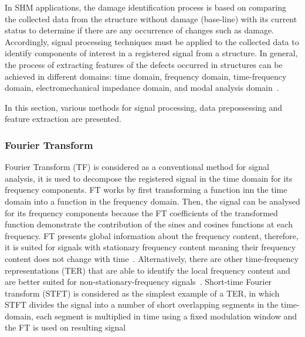 In SHM applications, the damage identification process is based on comparing the collected data from the structure without damage (base-line) with its current status to determine if there are any occurrence of changes such as damage.
Accordingly, signal processing techniques must be applied to the collected data to identify components of interest in a registered signal from a structure.
In general, the process of extracting features of the defects occurred in structures can be achieved in different domains: time domain, frequency domain, time-frequency domain, electromechanical impedance domain, and modal analysis domain~\cite{Khan2019}.

In this section, various methods for signal processing, data prepossessing and feature extraction are presented.

\subsubsection{Fourier Transform} 
Fourier Transform (TF) is considered as a conventional method for signal analysis, it is used to decompose the registered signal in the time domain for its frequency components. 
FT works by first transforming a function inn the time domain into a function in the frequency domain. 
Then, the signal can be analysed for its frequency components because the FT coefficients of the transformed function demonstrate the contribution of the sines and cosines functions at each frequency.
FT presents global information about the frequency content, therefore, it is suited for signals with stationary frequency content meaning their frequency content does not change with time~\cite{Raghavan2006}.
Alternatively, there are other time-frequency representations (TER) that are able to identify the local frequency content and are better suited for non-stationary-frequency signals~\cite{Raghavan2006}.
Short-time Fourier transform (STFT) is considered as the simplest example of a TER, in which STFT divides the signal into a number of short overlapping segments in the time-domain, each segment is multiplied in time using a fixed modulation window and the FT is used on resulting signal~\cite{Raghavan2006}

